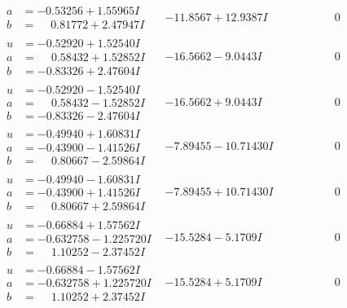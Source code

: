 \documentclass[1p]{elsarticle_modified}
\theoremstyle{definition}
\begin{document}
$$\begin{array}{c|c|c}
\begin{aligned}
a &= -0.53256 + 1.55965 I \\
b &= \phantom{-}0.81772 + 2.47947 I\end{aligned}
 & -11.8567 + 12.9387 I & \phantom{-0.000000 } 0 \\ \hline\begin{aligned}
u &= -0.52920 + 1.52540 I \\
a &= \phantom{-}0.58432 + 1.52852 I \\
b &= -0.83326 + 2.47604 I\end{aligned}
 & -16.5662 - 9.0443 I & \phantom{-0.000000 } 0 \\ \hline\begin{aligned}
u &= -0.52920 - 1.52540 I \\
a &= \phantom{-}0.58432 - 1.52852 I \\
b &= -0.83326 - 2.47604 I\end{aligned}
 & -16.5662 + 9.0443 I & \phantom{-0.000000 } 0 \\ \hline\begin{aligned}
u &= -0.49940 + 1.60831 I \\
a &= -0.43900 - 1.41526 I \\
b &= \phantom{-}0.80667 - 2.59864 I\end{aligned}
 & -7.89455 - 10.71430 I & \phantom{-0.000000 } 0 \\ \hline\begin{aligned}
u &= -0.49940 - 1.60831 I \\
a &= -0.43900 + 1.41526 I \\
b &= \phantom{-}0.80667 + 2.59864 I\end{aligned}
 & -7.89455 + 10.71430 I & \phantom{-0.000000 } 0 \\ \hline\begin{aligned}
u &= -0.66884 + 1.57562 I \\
a &= -0.632758 - 1.225720 I \\
b &= \phantom{-}1.10252 - 2.37452 I\end{aligned}
 & -15.5284 - 5.1709 I & \phantom{-0.000000 } 0 \\ \hline\begin{aligned}
u &= -0.66884 - 1.57562 I \\
a &= -0.632758 + 1.225720 I \\
b &= \phantom{-}1.10252 + 2.37452 I\end{aligned}
 & -15.5284 + 5.1709 I & \phantom{-0.000000 } 0 \\ \hline\begin{aligned}

\end{aligned}
\end{array}$$
\end{document}

